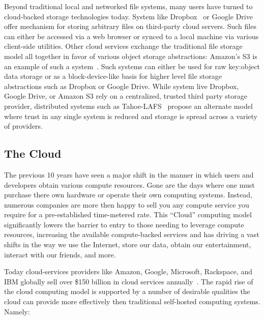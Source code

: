 Beyond traditional local and networked file systems, many users have
turned to cloud-backed storage technologies today. System like
Dropbox~\cite{dropbox} or Google Drive~\cite{google-drive} offer
mechanism for storing arbitrary files on third-party cloud
servers. Such files can either be accessed via a web browser or synced
to a local machine via various client-side utilities. Other cloud
services exchange the traditional file storage model all together in
favor of various object storage abstractions: Amazon's S3 is an
example of such a system~\cite{amazon-s3}. Such systems can either be
used for raw key:object data storage or as a block-device-like basis
for higher level file storage abstractions such as Dropbox or Google
Drive. While system live Dropbox, Google Drive, or Amazon S3 rely on a
centralized, trusted third party storage provider, distributed systems
such as Tahoe-LAFS~\cite{Wilcox-O'Hearn2008} propose an alternate
model where trust in any single system is reduced and storage is
spread across a variety of providers.

\subsection{The Cloud}

The previous 10 years have seen a major shift in the manner in which
users and developers obtain various compute resources. Gone are the
days where one must purchase there own hardware or operate their own
computing systems. Instead, numerous companies are more then happy to
sell you any compute service you require for a pre-established
time-metered rate. This ``Cloud'' computing model significantly lowers
the barrier to entry to those needing to leverage compute resources,
increasing the available compute-backed services and has driving a
vast shifts in the way we use the Internet, store our data, obtain our
entertainment, interact with our friends, and more.

Today cloud-services providers like Amazon, Google, Microsoft,
Rackspace, and IBM globally sell over \$150 billion in cloud services
annually~\cite{Flood2013}. The rapid rise of the cloud computing model
is supported by a number of desirable qualities the cloud can provide
more effectively then traditional self-hosted computing
systems. Namely:

